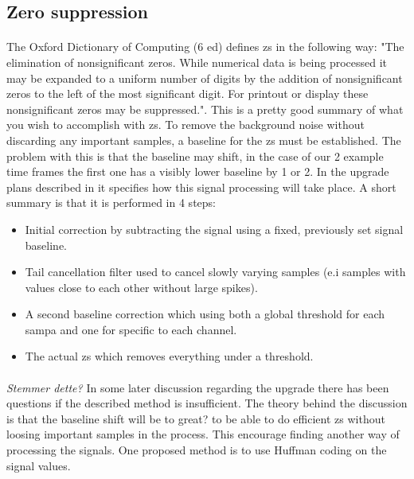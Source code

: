\documentclass[a4paper]{report}
\begin{document}
\subsection{Zero suppression} %
\paragraph{}
The Oxford Dictionary of Computing (6 ed) defines \gls{zs} in the following way: "The elimination of nonsignificant zeros.
While numerical data is being processed it may be expanded to a uniform number of digits by the addition of nonsignificant zeros to the left of the most significant digit.
For printout or display these nonsignificant zeros may be suppressed."\cite{zerosuppression}.
This is a pretty good summary of what you wish to accomplish with \gls{zs}.
To remove the background noise without discarding any important samples, a baseline for the \gls{zs} must be established.
The problem with this is that the baseline may shift, in the case of our 2 example time frames the first one has a visibly lower baseline by 1 or 2.
In the upgrade plans described in \cite{tdr-015} it specifies how this signal processing will take place.
A short summary is that it is performed in 4 steps:

\begin{itemize}
	\item Initial correction by subtracting the signal using a fixed, previously set signal baseline.
	\item Tail cancellation filter used to cancel slowly varying samples (e.i samples with values close to each other without large spikes).
	\item A second baseline correction which using both a global threshold for each \gls{sampa} and one for specific to each channel.
	\item The actual \gls{zs} which removes everything under a threshold.
\end{itemize}

%
\paragraph{}
\textit{Stemmer dette?}
In some later discussion regarding the upgrade there has been questions if the described method is insufficient.
The theory behind the discussion is that the baseline shift will be to great? to be able to do efficient \gls{zs} without loosing important samples in the process.
This encourage finding another way of processing the signals.
One proposed method is to use Huffman coding on the signal values.
\end{document}
